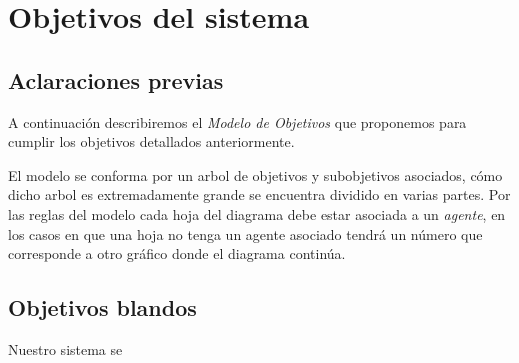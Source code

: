 \documentclass[11pt, a4paper, spanish]{article}
\begin{document}
	
\section{Objetivos del sistema}

\subsection{Aclaraciones previas}

	A continuaci\'on describiremos el \emph{Modelo de Objetivos} que proponemos para cumplir los objetivos detallados anteriormente.

	El modelo se conforma por un arbol de objetivos y subobjetivos asociados, c\'omo dicho arbol es extremadamente grande se encuentra 
	dividido en varias partes. Por las reglas del modelo cada hoja del diagrama debe estar asociada a un \emph{agente}, en los casos en que
	una hoja no tenga un agente asociado tendr\'a un n\'umero que corresponde a otro gr\'afico donde el diagrama contin\'ua.
	
\subsection{Objetivos blandos}

	Nuestro sistema se 
\end{document}
